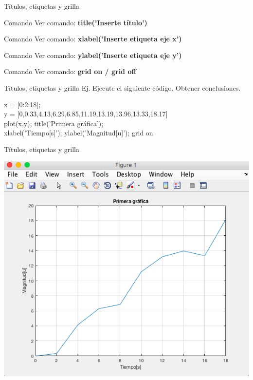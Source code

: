 \documentclass{bredelebeamer}
\begin{document}
\begin{frame}{Títulos, etiquetas y grilla}
\begin{exampleblock}{Comando}
Ver comando: \textbf{title('Inserte título')}
\end{exampleblock}
\begin{exampleblock}{Comando}
Ver comando: \textbf{xlabel('Inserte etiqueta eje x')}
\end{exampleblock}
\begin{exampleblock}{Comando}
Ver comando: \textbf{ylabel('Inserte etiqueta eje y')}
\end{exampleblock}
\begin{exampleblock}{Comando}
Ver comando: \textbf{grid on / grid off}
\end{exampleblock}
\end{frame}

\begin{frame}{Títulos, etiquetas y grilla}
Ej. Ejecute el siguiente código. Obtener conclusiones.
\begin{center}
x = [0:2:18];\\
y = [0,0.33,4.13,6.29,6.85,11.19,13.19,13.96,13.33,18.17]\\
plot(x,y); title('Primera gráfica');\\
xlabel('Tiempo[s]'); ylabel('Magnitud[u]'); grid on\\
\end{center}
\end{frame}

\begin{frame}{Títulos, etiquetas y grilla}
\begin{center}
\includegraphics[scale=0.35]{images/pantalla15.png}
\end{center}
\end{frame}
\end{document}
